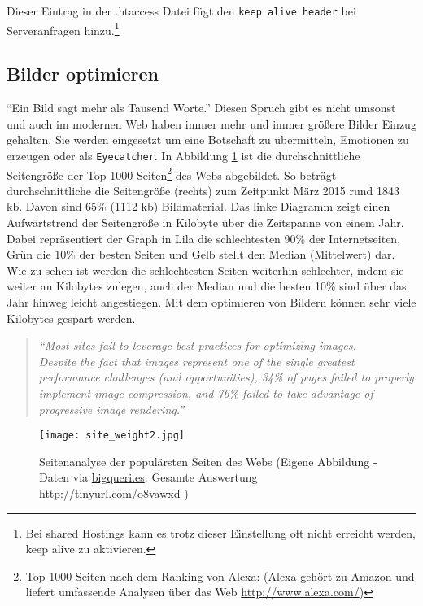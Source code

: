 		Dieser Eintrag in der .htaccess Datei fügt den \texttt{keep alive header} bei Serveranfragen hinzu.\footnote{Bei shared Hostings kann es trotz dieser Einstellung oft nicht erreicht werden, keep alive zu aktivieren.}
		\pagebreak


	\subsection{Bilder optimieren} %
	\label{sub:bilder_optimieren}


		"`Ein Bild sagt mehr als Tausend Worte."' Diesen Spruch gibt es nicht umsonst und auch im modernen Web haben immer mehr und immer größere Bilder Einzug gehalten. Sie werden eingesetzt um eine Botschaft zu übermitteln, Emotionen zu erzeugen oder als \texttt{Eyecatcher}. In Abbildung \ref{fig:site_weight} ist die durchschnittliche Seitengröße der Top 1000 Seiten\footnote{Top 1000 Seiten nach dem Ranking von Alexa: (Alexa gehört zu Amazon und liefert umfassende Analysen über das Web \url{http://www.alexa.com/}) } des Webs abgebildet. So beträgt durchschnittliche die Seitengröße (rechts) zum Zeitpunkt März 2015 rund 1843 kb. Davon sind 65\% (1112 kb) Bildmaterial. Das linke Diagramm zeigt einen Aufwärtstrend der Seitengröße in Kilobyte über die Zeitspanne von einem Jahr. Dabei repräsentiert der Graph in Lila die schlechtesten 90\% der Internetseiten, Grün die 10\% der besten Seiten und Gelb stellt den Median (Mittelwert) dar. Wie zu sehen ist werden die schlechtesten Seiten weiterhin schlechter, indem sie weiter an Kilobytes zulegen, auch der Median und die besten 10\% sind über das Jahr hinweg leicht angestiegen. Mit dem optimieren von Bildern können sehr viele Kilobytes gespart werden.

		\begin{quote}
			\textit{"`Most sites fail to leverage best practices for optimizing images.\\
			Despite the fact that images represent one of the single greatest performance challenges (and opportunities),		34\% of pages failed to properly implement image compression, and 76\% failed to take advantage of progressive	image rendering."'} \autocite[p. 4]{radware14}
		\end{quote}

		\begin{figure}[htbp]
			\begin{center}
				\texttt{[image: site\_weight2.jpg]}
				\caption{Seitenanalyse der populärsten Seiten des Webs (Eigene Abbildung - Daten via \url{bigqueri.es}: Gesamte Auswertung \url{http://tinyurl.com/o8vawxd} )}
				\label{fig:site_weight}
			\end{center}
		\end{figure}

